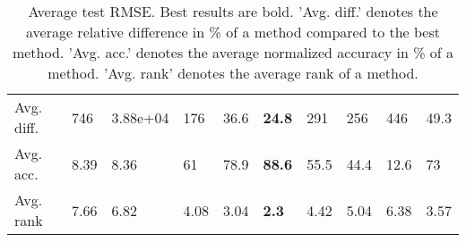 \begin{table}[ht!]
\begin{tabular}{llllllllll}
   \hline
Avg. diff. & 746 & 3.88e+04 & 176 & 36.6 & \textbf{24.8} & 291 & 256 & 446 & 49.3 \\ 
  Avg. acc. & 8.39 & 8.36 & 61 & 78.9 & \textbf{88.6} & 55.5 & 44.4 & 12.6 & 73 \\ 
  Avg. rank & 7.66 & 6.82 & 4.08 & 3.04 & \textbf{2.3} & 4.42 & 5.04 & 6.38 & 3.57 \\ 
   \hline
\hline
\end{tabular}
\endgroup
\caption{Average test RMSE. 
                  Best results are bold. 
                  'Avg. diff.' denotes the average relative difference in \% of a method compared to the best method.
                  'Avg. acc.' denotes the average normalized accuracy in \% of a method.
                  'Avg. rank' denotes the average rank of a method.} 
\label{TABLES/table_results_RMSE}
\end{table}

